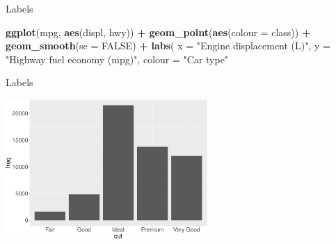 \documentclass[ignorenonframetext,]{beamer}
\newenvironment{Shaded}{\begin{snugshade}}{\end{snugshade}}
\newcommand{\DataTypeTok}[1]{\textcolor[rgb]{0.13,0.29,0.53}{#1}}
\newcommand{\KeywordTok}[1]{\textcolor[rgb]{0.13,0.29,0.53}{\textbf{#1}}}
\newcommand{\NormalTok}[1]{#1}
\newcommand{\OperatorTok}[1]{\textcolor[rgb]{0.81,0.36,0.00}{\textbf{#1}}}
\newcommand{\OtherTok}[1]{\textcolor[rgb]{0.56,0.35,0.01}{#1}}
\newcommand{\StringTok}[1]{\textcolor[rgb]{0.31,0.60,0.02}{#1}}
\begin{document}
\begin{frame}[fragile]{Labels}
\protect\hypertarget{labels-5}{}

\begin{Shaded}
\begin{Highlighting}[]
\KeywordTok{ggplot}\NormalTok{(mpg, }\KeywordTok{aes}\NormalTok{(displ, hwy)) }\OperatorTok{+}
\StringTok{  }\KeywordTok{geom_point}\NormalTok{(}\KeywordTok{aes}\NormalTok{(}\DataTypeTok{colour =}\NormalTok{ class)) }\OperatorTok{+}
\StringTok{  }\KeywordTok{geom_smooth}\NormalTok{(}\DataTypeTok{se =} \OtherTok{FALSE}\NormalTok{) }\OperatorTok{+}
\StringTok{  }\KeywordTok{labs}\NormalTok{(}
    \DataTypeTok{x =} \StringTok{"Engine displacement (L)"}\NormalTok{,}
    \DataTypeTok{y =} \StringTok{"Highway fuel economy (mpg)"}\NormalTok{,}
    \DataTypeTok{colour =} \StringTok{"Car type"}
\end{Highlighting}
\end{Shaded}

\end{frame}

\begin{frame}{Labels}
\protect\hypertarget{labels-6}{}

\begin{center}\includegraphics[height=200px]{data-visualization_files/figure-beamer/unnamed-chunk-117-1} \end{center}

\end{frame}
\end{document}
